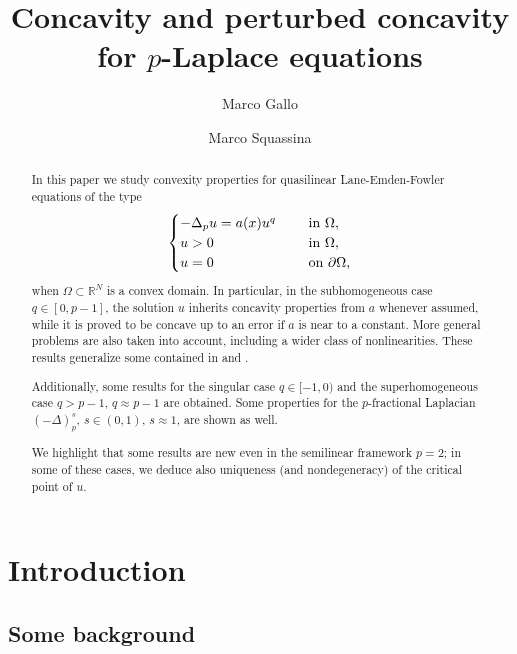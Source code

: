 \documentclass[11pt, reqno]{amsart}
\title[Concavity for $p$-Laplace equations]
{Concavity and perturbed concavity \\ for $p$-Laplace equations}
\author[M.\ Gallo]{Marco Gallo \orcidlink{0000-0002-3141-9598}}
\author[M.\ Squassina]{Marco Squassina \orcidlink{0000-0003-0858-4648}}
\theoremstyle{definition}
\numberwithin{equation}{section}
\begin{document}
\maketitle

\begin{abstract}
\vspace{-1.5em}
In this paper we study convexity properties for quasilinear Lane-Emden-Fowler equations of the type
$$\begin{cases}
-\Delta_p u = a(x) u^q & \quad \hbox{ in $\Omega$},\\ 
u >0 & \quad \hbox{ in $\Omega$}, \\
u =0 & \quad \hbox{ on $\partial \Omega$},
\end{cases}$$
when $\Omega \subset \mathbb{R}^N$ is a convex domain. 
In particular, in the subhomogeneous case $q \in [0,p-1]$, the solution $u$ inherits concavity properties from $a$ whenever assumed, while it is proved to be concave up to an error if $a$ is near to a constant. 
More general problems are also taken into account, including a wider class of nonlinearities. 
These results generalize some contained in \cite{Ken85} and \cite{Sak87}. 

Additionally, some results for the singular case $q \in [-1,0)$ and the superhomogeneous case $q>p-1$, $q \approx p-1$ are obtained. 
Some properties for the $p$-fractional Laplacian $(-\Delta)^s_p$, $s\in (0,1)$, $s \approx 1$, are shown as well. 

We highlight that some results are new even in the semilinear framework $p=2$; in some of these cases, we deduce also uniqueness (and nondegeneracy) of the critical point of $u$. 
\end{abstract}

\bigskip

\smallskip

\begin{center}
\begin{minipage}{10cm}
		\small
		\tableofcontents
\end{minipage}
\end{center}

\newpage

\section{Introduction}

\subsection{Some background}
\label{sec_background}
\end{document}
